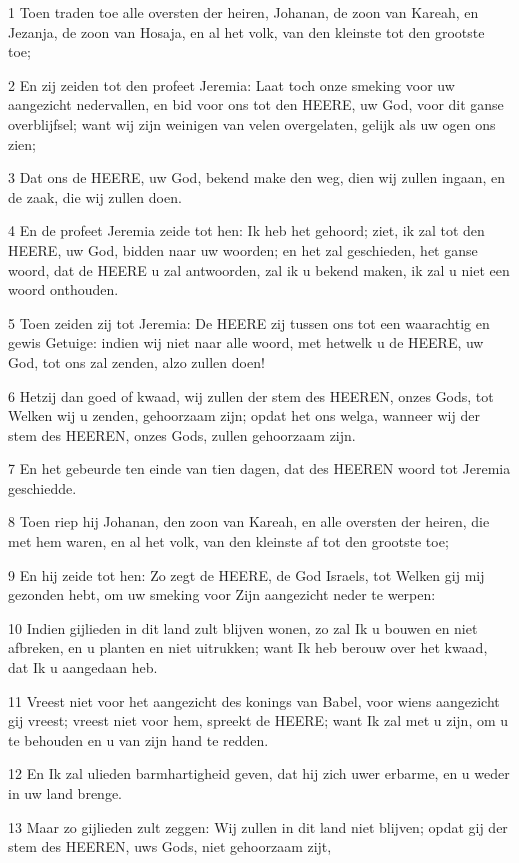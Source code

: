 \par 1 Toen traden toe alle oversten der heiren, Johanan, de zoon van Kareah, en Jezanja, de zoon van Hosaja, en al het volk, van den kleinste tot den grootste toe;
\par 2 En zij zeiden tot den profeet Jeremia: Laat toch onze smeking voor uw aangezicht nedervallen, en bid voor ons tot den HEERE, uw God, voor dit ganse overblijfsel; want wij zijn weinigen van velen overgelaten, gelijk als uw ogen ons zien;
\par 3 Dat ons de HEERE, uw God, bekend make den weg, dien wij zullen ingaan, en de zaak, die wij zullen doen.
\par 4 En de profeet Jeremia zeide tot hen: Ik heb het gehoord; ziet, ik zal tot den HEERE, uw God, bidden naar uw woorden; en het zal geschieden, het ganse woord, dat de HEERE u zal antwoorden, zal ik u bekend maken, ik zal u niet een woord onthouden.
\par 5 Toen zeiden zij tot Jeremia: De HEERE zij tussen ons tot een waarachtig en gewis Getuige: indien wij niet naar alle woord, met hetwelk u de HEERE, uw God, tot ons zal zenden, alzo zullen doen!
\par 6 Hetzij dan goed of kwaad, wij zullen der stem des HEEREN, onzes Gods, tot Welken wij u zenden, gehoorzaam zijn; opdat het ons welga, wanneer wij der stem des HEEREN, onzes Gods, zullen gehoorzaam zijn.
\par 7 En het gebeurde ten einde van tien dagen, dat des HEEREN woord tot Jeremia geschiedde.
\par 8 Toen riep hij Johanan, den zoon van Kareah, en alle oversten der heiren, die met hem waren, en al het volk, van den kleinste af tot den grootste toe;
\par 9 En hij zeide tot hen: Zo zegt de HEERE, de God Israels, tot Welken gij mij gezonden hebt, om uw smeking voor Zijn aangezicht neder te werpen:
\par 10 Indien gijlieden in dit land zult blijven wonen, zo zal Ik u bouwen en niet afbreken, en u planten en niet uitrukken; want Ik heb berouw over het kwaad, dat Ik u aangedaan heb.
\par 11 Vreest niet voor het aangezicht des konings van Babel, voor wiens aangezicht gij vreest; vreest niet voor hem, spreekt de HEERE; want Ik zal met u zijn, om u te behouden en u van zijn hand te redden.
\par 12 En Ik zal ulieden barmhartigheid geven, dat hij zich uwer erbarme, en u weder in uw land brenge.
\par 13 Maar zo gijlieden zult zeggen: Wij zullen in dit land niet blijven; opdat gij der stem des HEEREN, uws Gods, niet gehoorzaam zijt,
